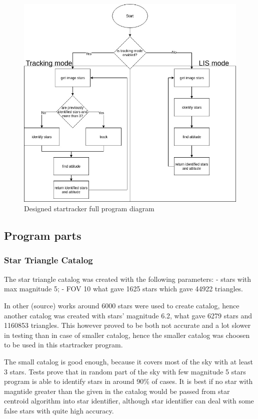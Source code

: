 \documentclass[12pt,a4paper,oneside]{article}
\begin{document}
\begin{figure}[!htbp]
\includegraphics[scale=0.53]{startracker_full_diagram.jpg}
\centering
\caption{Designed startracker full program diagram}
\label{fig:startracker_diagram}
\end{figure}


\subsection{Program parts}

\subsubsection{Star Triangle Catalog}

The star triangle catalog was created with the following parameters:
- stars with max magnitude 5;
- FOV 10\degree
what gave 1625 stars which gave 44922 triangles.

In other (source) works around 6000 stars were used to create catalog, hence another catalog was created with stars' magnitude 6.2, what gave 6279 stars and 1160853 triangles. This however proved to be both not accurate and a lot slower in testing than in case of smaller catalog, hence the smaller catalog was choosen to be used in this startracker program.

The small catalog is good enough, because it covers most of the sky with at least 3 stars. Tests prove that in random part of the sky with few magnitude 5 stars program is able to identify stars in around 90\% of cases. It is best if no star with magntide greater than the given in the catalog would be passed from star centroid algorithm into star identifier, although star identifier can deal with some false stars with quite high accuracy.
\end{document}
